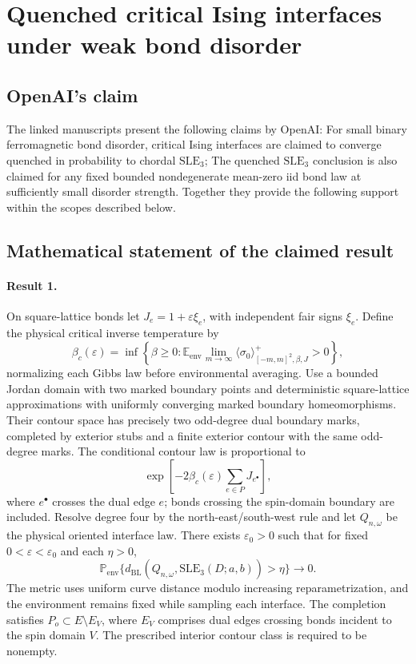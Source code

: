 \documentclass[11pt]{article}
\begin{document}
\section*{Quenched critical Ising interfaces under weak bond disorder}

\subsection{OpenAI's claim}
The linked manuscripts present the following claims by OpenAI: For small binary ferromagnetic bond disorder, critical Ising interfaces are claimed to converge quenched in probability to chordal $\mathrm{SLE}_3$; The quenched $\mathrm{SLE}_3$ conclusion is also claimed for any fixed bounded nondegenerate mean-zero iid bond law at sufficiently small disorder strength. Together they provide the following support within the scopes described below.

\subsection{Mathematical statement of the claimed result}
\paragraph{Result 1.} On square-lattice bonds let $J_e=1+\varepsilon\xi_e$, with independent fair signs $\xi_e$. Define the physical critical inverse temperature by
\[
 \beta_c(\varepsilon)=\inf\left\{\beta\ge0:
 \mathbb E_{\mathrm{env}}\lim_{m\to\infty}\langle\sigma_0\rangle^+_{[-m,m]^2,\beta,J}>0\right\},
\]
normalizing each Gibbs law before environmental averaging. Use a bounded Jordan domain with two marked boundary points and deterministic square-lattice approximations with uniformly converging marked boundary homeomorphisms. Their contour space has precisely two odd-degree dual boundary marks, completed by exterior stubs and a finite exterior contour with the same odd-degree marks. The conditional contour law is proportional to
\[
 \exp\left[-2\beta_c(\varepsilon)\sum_{e\in P}J_{e^\bullet}\right],
\]
where $e^\bullet$ crosses the dual edge $e$; bonds crossing the spin-domain boundary are included. Resolve degree four by the north-east/south-west rule and let $Q_{n,\omega}$ be the physical oriented interface law. There exists $\varepsilon_0>0$ such that for fixed $0<\varepsilon<\varepsilon_0$ and each $\eta>0$,
\[
 \mathbb P_{\mathrm{env}}\{d_{\mathrm{BL}}(Q_{n,\omega},\mathrm{SLE}_3(D;a,b))>\eta\}\to0.
\]
The metric uses uniform curve distance modulo increasing reparametrization, and the environment remains fixed while sampling each interface. The completion satisfies $P_o\subset E\setminus E_V$, where $E_V$ comprises dual edges crossing bonds incident to the spin domain $V$. The prescribed interior contour class is required to be nonempty.
\end{document}
